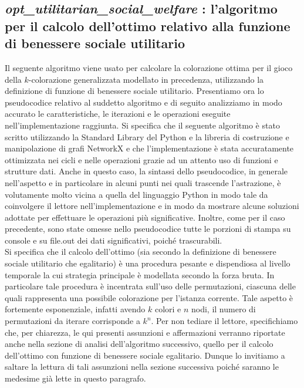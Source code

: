 \subsection{\textit{opt\_utilitarian\_social\_welfare} : l'algoritmo per il calcolo dell'ottimo relativo alla funzione di benessere sociale utilitario}
\justify
Il seguente algoritmo viene usato per calcolare la colorazione ottima per il gioco della \(k\)-colorazione generalizzata modellato in precedenza, utilizzando la definizione di funzione di benessere sociale utilitario. Presentiamo ora lo pseudocodice relativo al suddetto algoritmo e di seguito analizziamo in modo accurato le caratteristiche, le iterazioni e le operazioni eseguite nell'implementazione raggiunta. Si specifica che il seguente algoritmo è stato scritto utilizzando la Standard Library del Python e la libreria di costruzione e manipolazione di grafi NetworkX e che l'implementazione è stata accuratamente ottimizzata nei cicli e nelle operazioni grazie ad un attento uso di funzioni e strutture dati. Anche in questo caso, la sintassi dello pseudocodice, in generale nell'aspetto e in particolare in alcuni punti nei quali trascende l'astrazione, è volutamente molto vicina a quella del linguaggio Python in modo tale da coinvolgere il lettore nell'implementazione e in modo da mostrare alcune soluzioni adottate per effettuare le operazioni più significative. Inoltre, come per il caso precedente, sono state omesse nello pseudocodice tutte le porzioni di stampa su console e su file.out dei dati significativi, poiché trascurabili.\\
Si specifica che il calcolo dell'ottimo (sia secondo la definizione di benessere sociale utilitario che egalitario) è una procedura pesante e dispendiosa al livello temporale la cui strategia principale è modellata secondo la forza bruta. In particolare tale procedura è incentrata sull'uso delle permutazioni, ciascuna delle quali rappresenta una possibile colorazione per l'istanza corrente. Tale aspetto è fortemente esponenziale, infatti avendo \(k\) colori e \(n\) nodi, il numero di permutazioni da iterare corrisponde a \(k^n\). Per non tediare il lettore, specifichiamo che, per chiarezza, le qui presenti assunzioni e affermazioni verranno riportate anche nella sezione di analisi dell'algoritmo successivo, quello per il calcolo dell'ottimo con funzione di benessere sociale egalitario. Dunque lo invitiamo a saltare la lettura di tali assunzioni nella sezione successiva poiché saranno le medesime già lette in questo paragrafo.

